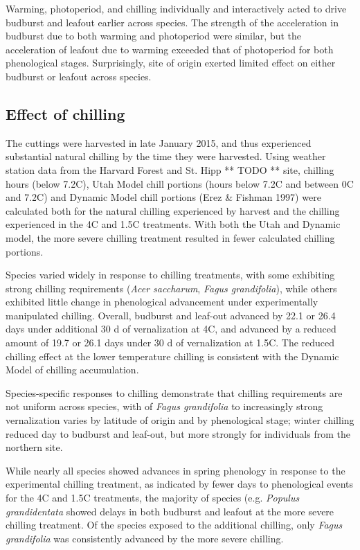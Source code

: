 \documentclass{article}
\begin{document}
Warming, photoperiod, and chilling individually and interactively acted to drive budburst and leafout earlier across species. The strength of the acceleration in budburst due to both warming and photoperiod were similar, but the acceleration of leafout due to warming exceeded that of photoperiod for both phenological stages. Surprisingly, site of origin exerted limited effect on either budburst or leafout across species. 

\subsection*{Effect of chilling}
The cuttings were harvested in late January 2015, and thus experienced substantial natural chilling by the time they were harvested. Using weather station data from the Harvard Forest and St. Hipp ** TODO ** site, chilling hours (below 7.2\degree C), Utah Model chill portions (hours below 7.2\degree C and between 0\degree C and 7.2\degree C) and Dynamic Model chill portions (Erez \& Fishman 1997) were calculated both for the natural chilling experienced by harvest and the chilling experienced in the 4\degree C and 1.5\degree C treatments. With both the Utah and Dynamic model, the more severe chilling treatment resulted in fewer calculated chilling portions.

Species varied widely in response to chilling treatments, with some exhibiting strong chilling requirements (\emph{Acer saccharum}, \emph{Fagus grandifolia}), while others exhibited little change in phenological advancement under experimentally manipulated chilling. Overall, budburst and leaf-out advanced by 22.1 or 26.4 days under additional 30 d of vernalization at 4\degree C, and advanced by a reduced amount of 19.7 or 26.1 days under 30 d of vernalization at 1.5\degree C. The reduced chilling effect at the lower temperature chilling is consistent with the Dynamic Model of chilling accumulation.

Species-specific responses to chilling demonstrate that chilling requirements are not uniform across species, with 
of \emph{Fagus grandifolia} to increasingly strong vernalization varies by latitude of origin and by phenological stage; winter chilling reduced day to budburst and leaf-out, but more strongly for individuals from the northern site.

While nearly all species showed advances in spring phenology in response to the experimental chilling treatment, as indicated by fewer days to phenological events for the 4\degree C and 1.5\degree C treatments, the majority of species (e.g. \emph{Populus grandidentata} showed delays in both budburst and leafout at the more severe chilling treatment. Of the species exposed to the additional chilling, only \emph{Fagus grandifolia} was consistently advanced by the more severe chilling.
\end{document}
